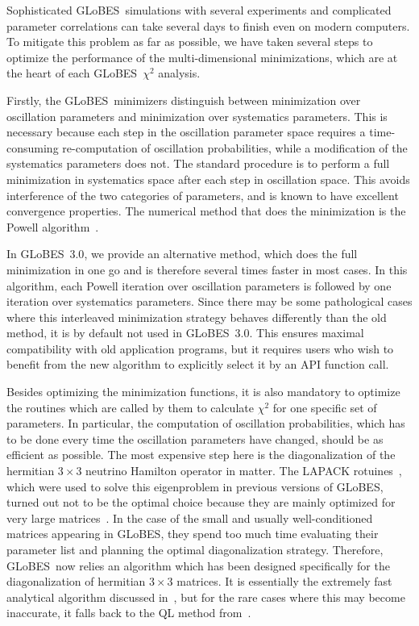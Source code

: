 \documentclass[12pt,a4paper]{article}
\newcommand{\GLOBES}{{\sf GLoBES}}
\newcommand{\GLOBESN}{{\sf GLoBES~3.0}}
\begin{document}
Sophisticated \GLOBES\ simulations with several experiments and complicated
parameter correlations can take several days to finish even on modern computers.
To mitigate this problem as far as possible, we have taken several steps to
optimize the performance of the multi-dimensional minimizations, which are at
the heart of each \GLOBES\ $\chi^2$ analysis.

Firstly, the \GLOBES\ minimizers distinguish between minimization over
oscillation parameters and minimization over systematics parameters.
This is necessary because each step in the oscillation parameter space
requires a time-consuming re-computation of oscillation probabilities,
while a modification of the systematics parameters does not. The standard
procedure is to perform a full minimization in systematics space after each
step in oscillation space. This avoids interference of the two categories
of parameters, and is known to have excellent convergence properties.
The numerical method that does the minimization is the Powell
algorithm~\cite{Press:NumRecip}.

In \GLOBESN , we provide an alternative method, which does the full minimization
in one go and is therefore several times faster in most cases. In this algorithm,
each Powell iteration over oscillation parameters is followed by one iteration
over systematics parameters. Since there may be some pathological cases where this
interleaved minimization strategy behaves differently than the old method,
it is by default not used in \GLOBESN . This ensures maximal compatibility
with old application programs, but it requires users who wish to benefit from the
new algorithm to explicitly select it by an API function call.

Besides optimizing the minimization functions, it is also mandatory to
optimize the routines which are called by them to calculate $\chi^2$
for one specific set of parameters. In particular, the computation of
oscillation probabilities, which has to be done every time the oscillation
parameters have changed, should be as efficient as possible. The most expensive
step here is the diagonalization of the hermitian $3\times3$ neutrino Hamilton
operator in matter. The LAPACK rotuines~\cite{Anderson:LAPACK}, which were
used to solve this eigenproblem in previous versions of \GLOBES, turned out
not to be the optimal choice because they are mainly optimized for very large
matrices~\cite{Kopp:2006wp}. In the case of the small and usually well-conditioned
matrices appearing in \GLOBES, they spend too much time evaluating their parameter
list and planning the optimal diagonalization strategy. Therefore, \GLOBES\ now
relies an algorithm which has been designed specifically for the diagonalization
of hermitian $3\times3$ matrices. It is essentially the extremely fast analytical
algorithm discussed in~\cite{Kopp:2006wp}, but for the rare cases where this may become
inaccurate, it falls back to the QL method from~\cite{Press:NumRecip}.
\end{document}
